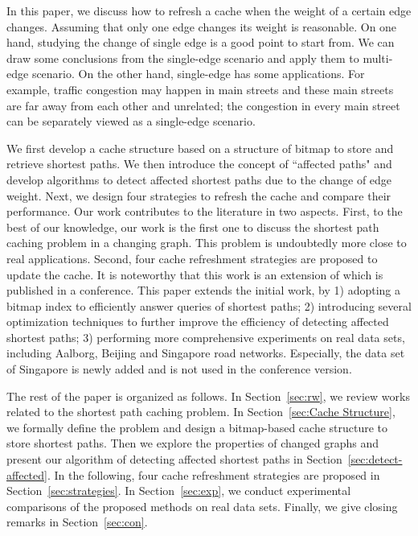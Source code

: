 In this paper, we discuss how to refresh a cache when the weight of a certain edge changes.
Assuming that only one edge changes its weight is reasonable.
On one hand, studying the change of single edge is a good point to start from.
We can draw some conclusions from the single-edge scenario and apply them to multi-edge scenario.
On the other hand, single-edge has some applications. For example, traffic congestion may happen in main streets and these main streets are far away from each other and unrelated; the congestion in every main street can be separately viewed as a single-edge scenario.

We first develop a cache structure based on a structure of bitmap to store and retrieve shortest paths. We then introduce the concept of ``affected paths" and develop algorithms to detect affected shortest paths due to the change of edge weight.
Next, we design four strategies to refresh the cache and compare their performance.
Our work contributes to the literature in two aspects. First, to the best of our knowledge, our work is the first one to discuss the shortest path caching problem in a changing graph.
This problem is undoubtedly more close to real applications.
Second, four cache refreshment strategies are proposed to update the cache. It is noteworthy that this work is an extension of \cite{Li2014refreshment} which is published in a conference.
This paper extends the initial work, by 1) adopting a bitmap index to efficiently answer queries of shortest paths; 2) introducing several optimization techniques to further improve the efficiency of detecting affected shortest paths; 3) performing more comprehensive experiments on real data sets, including Aalborg, Beijing and Singapore road networks. Especially, the data set of Singapore is newly added and is not used in the conference version.


The rest of the paper is organized as follows. In Section~\ref{sec:rw}, we review works related to the shortest path caching problem.
In Section~\ref{sec:Cache Structure}, we formally define the problem and design a bitmap-based cache structure to store shortest paths.
Then we explore the properties of changed graphs and present our algorithm of detecting affected shortest paths in Section~\ref{sec:detect-affected}.
In the following, four cache refreshment strategies are proposed in Section~\ref{sec:strategies}.
In Section~\ref{sec:exp}, we conduct experimental comparisons of the proposed methods on real data sets.
Finally, we give closing remarks in Section~\ref{sec:con}.


